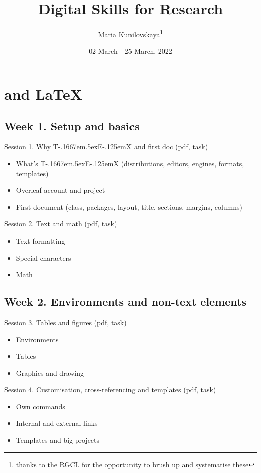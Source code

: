 \documentclass[a4paper,12pt]{article} %
\title{\vspace{-4em} Digital Skills for Research}
\author{Maria Kunilovskaya\thanks{thanks to the RGCL for the opportunity to brush up and systematise these}}
\date{02 March - 25 March, 2022}
\def\TeX{{\rm T\kern-.1667em\lower.5ex\hbox{E}\kern-.125emX }}
\begin{document}
	
	\maketitle

\vspace{-2em}

\section{{\color{red}\TeX and \LaTeX}}

\subsection{Week 1. Setup and basics}
	Session 1. Why \TeX and first doc (\href{https://github.com/kunilovskaya/dskills_workshop/blob/main/w1_latex_basics/s1/session1.pdf}{pdf}, \href{https://github.com/kunilovskaya/dskills_workshop/blob/main/w1_latex_basics/s1/practice1.tex}{task})
		\begin{itemize}
			\item What's \TeX (distributions, editors, engines, formats, templates)
			\item Overleaf account and project
			\item First document (class, packages, layout, title, sections, margins, columns)
		\end{itemize} 
	Session 2. Text and math (\href{https://github.com/kunilovskaya/dskills_workshop/blob/main/w1_latex_basics/s2/session2.pdf}{pdf}, \href{https://github.com/kunilovskaya/dskills_workshop/blob/main/w1_latex_basics/s2/practice2.pdf}{task})
		\begin{itemize}
			\item Text formatting
			\item Special characters
			\item Math
		\end{itemize}

\subsection*{Week 2. Environments and non-text elements}
	Session 3. Tables and figures (\href{}{pdf}, \href{}{task})
			\begin{itemize}
				\item Environments
				\item Tables
				\item Graphics and drawing
			\end{itemize}
	Session 4. Customisation, cross-referencing and templates (\href{}{pdf}, \href{}{task})
			\begin{itemize}
				\item Own commands
				\item Internal and external links
				\item Templates and big projects
			\end{itemize}
\end{document}
